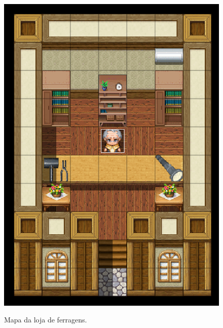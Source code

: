 \begin{figure}[!htbp]
	\centering
	\caption{Mapa da loja de ferragens.}
	\includegraphics[scale=0.45]{Textuais/Pictures/Loja_Ferragens.png}
	\label{fig:loja-ferragens}
\end{figure}

